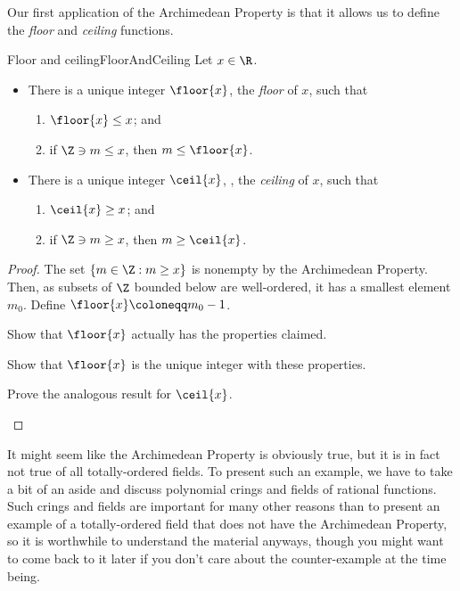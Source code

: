 Our first application of the Archimedean Property is that it allows us to define the \emph{floor} and \emph{ceiling} functions.
\begin{prp}{Floor and ceiling}{FloorAndCeiling}
Let $x\in \R$.
\begin{itemize}
\item There is a unique integer $\floor{x}$, the \emph{floor} of $x$, such that
\begin{enumerate}
\item $\floor{x}\leq x$; and
\item if $\Z \ni m\leq x$, then $m\leq \floor{x}$.
\end{enumerate}
\item There is a unique integer $\ceil{x}$, , the \emph{ceiling} of $x$, such that
\begin{enumerate}
\item $\ceil{x}\geq x$; and
\item if $\Z \ni m\geq x$, then $m\geq \ceil{x}$.
\end{enumerate}
\end{itemize}
\begin{proof}
The set $\{ m\in \Z :m\geq x\}$ is nonempty by the Archimedean Property.  Then, as subsets of $\Z$ bounded below are well-ordered, it has a smallest element $m_0$.  Define $\floor{x}\coloneqq m_0-1$.
\begin{exr}{}{}
Show that $\floor{x}$ actually has the properties claimed.
\end{exr}
\begin{exr}{}{}
Show that $\floor{x}$ is the unique integer with these properties.
\end{exr}
\begin{exr}{}{}
Prove the analogous result for $\ceil{x}$.
\end{exr}
\end{proof}
\end{prp}

It might seem like the Archimedean Property is obviously true, but it is in fact not true of all totally-ordered fields.  To present such an example, we have to take a bit of an aside and discuss polynomial crings and fields of rational functions.  Such crings and fields are important for many other reasons than to present an example of a totally-ordered field that does not have the Archimedean Property, so it is worthwhile to understand the material anyways, though you might want to come back to it later if you don't care about the counter-example at the time being.

